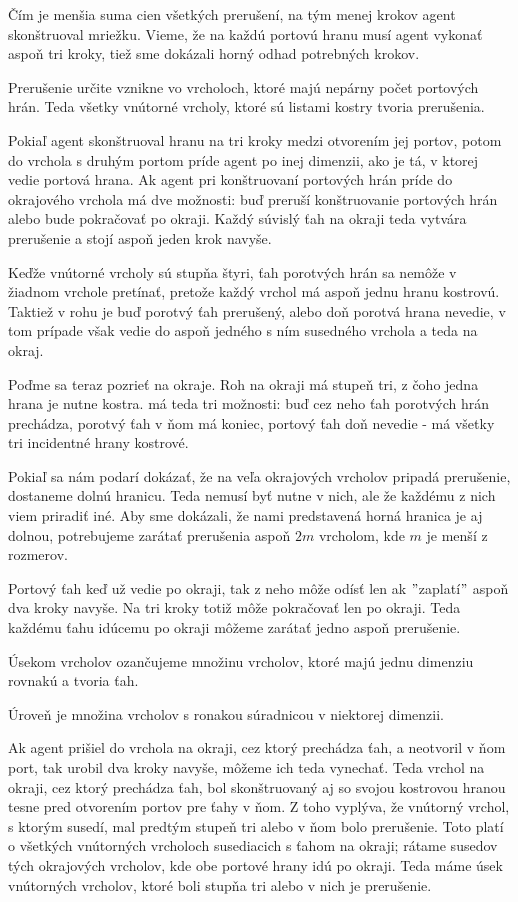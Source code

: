 Čím je menšia suma cien všetkých prerušení, na tým menej krokov agent
skonštruoval mriežku.
Vieme, že na každú portovú hranu musí agent vykonať aspoň tri kroky, tiež
sme dokázali horný odhad potrebných krokov.

Prerušenie určite vznikne vo vrcholoch, ktoré majú nepárny počet portových
hrán. Teda všetky vnútorné vrcholy, ktoré sú listami kostry tvoria
prerušenia.

Pokiaľ agent skonštruoval hranu na tri kroky medzi otvorením jej portov,
potom do vrchola s druhým portom príde agent po inej dimenzii, ako je tá,
v ktorej vedie portová hrana. Ak agent pri konštruovaní portových hrán príde
do okrajového vrchola má dve možnosti: buď preruší konštruovanie portových
hrán alebo bude pokračovať po okraji. Každý súvislý ťah na okraji teda
vytvára prerušenie a stojí aspoň jeden krok navyše.

Keďže vnútorné vrcholy sú stupňa štyri, ťah porotvých hrán sa nemôže v
žiadnom vrchole pretínať, pretože každý vrchol má aspoň jednu hranu kostrovú.
Taktiež v rohu je buď porotvý ťah prerušený, alebo doň porotvá hrana
nevedie, v tom prípade však vedie do aspoň jedného s ním susedného vrchola a
teda na okraj.

Poďme sa teraz pozrieť na okraje. Roh na okraji má stupeň tri, z čoho jedna
hrana je nutne kostra. má teda tri možnosti: buď cez neho ťah porotvých hrán
prechádza, porotvý ťah v ňom má koniec, portový ťah doň nevedie - má všetky
tri incidentné hrany kostrové.

Pokiaľ sa nám podarí dokázať, že na veľa okrajových vrcholov pripadá
prerušenie, dostaneme dolnú hranicu. Teda nemusí byť nutne v nich, ale že 
každému z nich viem priradiť iné. Aby sme dokázali, že nami predstavená
horná hranica je aj dolnou, potrebujeme zarátať prerušenia aspoň $2m$
vrcholom, kde $m$ je menší z rozmerov.

Portový ťah keď už vedie po okraji, tak z neho môže odísť len ak
$"$zaplatí$"$ aspoň dva kroky navyše. Na tri kroky totiž môže pokračovať len
po okraji. Teda každému ťahu idúcemu po okraji môžeme zarátať jedno aspoň
prerušenie.

\begin{ozn}
Úsekom vrcholov ozančujeme množinu vrcholov, ktoré majú jednu dimenziu
rovnakú a tvoria ťah.

Úroveň je množina vrcholov s ronakou súradnicou v niektorej dimenzii.
\end{ozn}

Ak agent prišiel do vrchola na okraji, cez ktorý prechádza ťah, a neotvoril
v ňom port, tak urobil dva kroky navyše, môžeme ich teda vynechať. Teda vrchol
na okraji, cez ktorý prechádza ťah, bol skonštruovaný aj so svojou kostrovou 
hranou tesne pred otvorením portov pre ťahy v ňom. Z toho vyplýva, že
vnútorný vrchol, s ktorým susedí, mal predtým stupeň tri alebo v ňom bolo
prerušenie. Toto platí o všetkých vnútorných vrcholoch susediacich s ťahom
na okraji; rátame susedov tých okrajových vrcholov, kde obe portové hrany
idú po okraji. Teda máme úsek vnútorných vrcholov, ktoré boli stupňa tri
alebo v nich je prerušenie.


